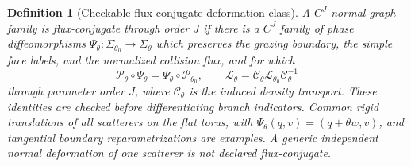 \documentclass[11pt]{amsart}
\theoremstyle{compactplain}
\theoremstyle{compactdefinition}
\newtheorem{definition}[theorem]{Definition}
\theoremstyle{compactremark}
\newcommand{\Ltransfer}{\mathscr L}
\newcommand{\Pcal}{\mathcal P}
\begin{document}
\begin{definition}[Checkable flux-conjugate deformation class]
\label{def:flux_conjugate_deformation_class}
A \(C^J\) normal-graph family is \emph{flux-conjugate through order \(J\)} if
there is a \(C^J\) family of phase diffeomorphisms
\(\Psi_\theta:\Sigma_{\theta_0}\to\Sigma_\theta\) which preserves the grazing
boundary, the simple face labels, and the normalized collision flux, and for
which
\[
 \Pcal_\theta\circ\Psi_\theta
 =\Psi_\theta\circ\Pcal_{\theta_0},
 \qquad
 \Ltransfer_\theta
 =\mathcal C_\theta\Ltransfer_{\theta_0}\mathcal C_\theta^{-1}
\]
through parameter order \(J\), where \(\mathcal C_\theta\) is the induced
density transport.  These identities are checked before differentiating branch
indicators.  Common rigid translations of all scatterers on the flat torus,
with \(\Psi_\theta(q,v)=(q+\theta w,v)\), and tangential boundary
reparametrizations are examples.  A generic independent normal deformation of
one scatterer is not declared flux-conjugate.
\end{definition}
\end{document}
